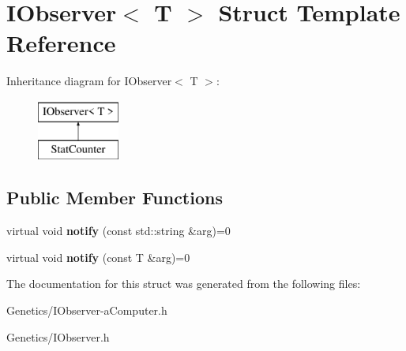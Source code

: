 \hypertarget{struct_i_observer}{}\section{I\+Observer$<$ T $>$ Struct Template Reference}
\label{struct_i_observer}
Inheritance diagram for I\+Observer$<$ T $>$\+:\begin{figure}[H]
\begin{center}
\leavevmode
\includegraphics[height=2.000000cm]{struct_i_observer}
\end{center}
\end{figure}
\subsection*{Public Member Functions}
\begin{DoxyCompactItemize}
\item 
virtual void {\bfseries notify} (const std\+::string \&arg)=0\hypertarget{struct_i_observer_a51f5898305d0a9004e9c7126c9015a45}{}\label{struct_i_observer_a51f5898305d0a9004e9c7126c9015a45}

\item 
virtual void {\bfseries notify} (const T \&arg)=0\hypertarget{struct_i_observer_a218fcc53f11b591e002c7f3552b26a78}{}\label{struct_i_observer_a218fcc53f11b591e002c7f3552b26a78}

\end{DoxyCompactItemize}


The documentation for this struct was generated from the following files\+:\begin{DoxyCompactItemize}
\item 
Genetics/I\+Observer-\/a\+Computer.\+h\item 
Genetics/I\+Observer.\+h\end{DoxyCompactItemize}
